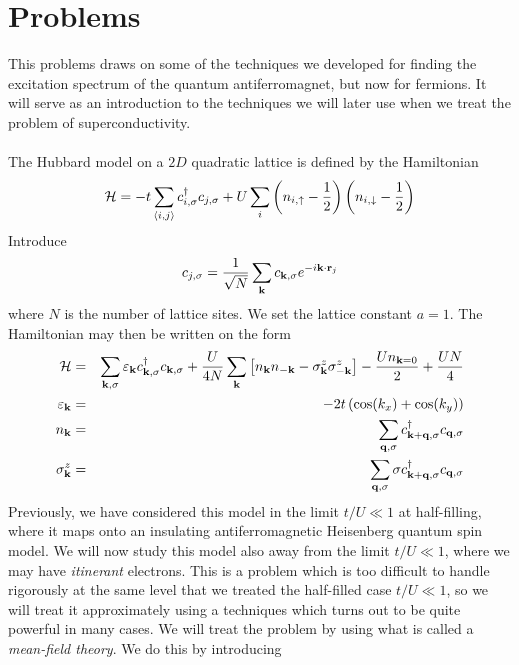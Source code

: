 \section*{Problems}

\begin{problem}
	
This problems draws on some of the techniques we developed for finding the excitation spectrum of the quantum antiferromagnet, but now for  fermions. It will serve as an introduction to the techniques we will later use when we treat the problem of superconductivity. 
\ \\
\ \\
The Hubbard model on a $2D$ quadratic lattice  is defined by the Hamiltonian
\begin{eqnarray}
	\mathcal{H} = -t \sum_{\langle i,j \rangle} c^{\dagger}_{i,\sigma} c_{j,\sigma} + 
	U \sum_i   \left( n_{i, \uparrow} -\frac{1}{2} \right) \left(   n_{i, \downarrow}  -\frac{1}{2} \right) \nonumber
\end{eqnarray}
Introduce 
\begin{eqnarray}
	c_{j,\sigma} = \frac{1}{\sqrt{N}} \sum_{{\bf k}} c_{{\bf k},\sigma} e^{- i {\bf k} \cdot {\bf r}_j} \nonumber
\end{eqnarray}
where $N$ is the number of lattice sites. We set the lattice constant $a=1$. The Hamiltonian may then be written on the form
\begin{eqnarray}
	\mathcal{H} &  = & \sum_{{\bf k},\sigma} \varepsilon_{{\bf k}} c^{\dagger}_{{\bf k},\sigma} c_{{\bf k},\sigma} + \frac{U}{4N} \sum_{{\bf k}} 
	\left[ n_{\bf k}  n_{-\bf k}  - \sigma^z_{\bf k}  \sigma^z_{-\bf k}  \right]  
	- \frac{U n_{{\bf k}=0}}{2} 
	+\frac{U N}{4}
	\nonumber \\
	\varepsilon_{{\bf k}} & = & - 2 t \left(  \cos(k_x) + \cos(k_y) \right) \nonumber  \\
	n_{\bf k} & = &  \sum_{{\bf q}, \sigma} c^{\dagger}_{{\bf k} + {\bf q},\sigma}  c_{{\bf q},\sigma} \nonumber \\
	\sigma^z_{\bf k} & = &  \sum_{{\bf q}, \sigma} \sigma c^{\dagger}_{{\bf k} + {\bf q},\sigma}  c_{{\bf q},\sigma} \nonumber 
\end{eqnarray} 
Previously, we have considered this model in the limit $t/U \ll 1$ at half-filling, where it maps onto an insulating antiferromagnetic Heisenberg quantum spin model. We will now study this model also away from the limit $t/U \ll 1$, where we may have {\it itinerant} electrons. This is a problem which is too difficult to handle rigorously at the same level that we treated the half-filled case $t/U \ll 1$, so we will treat it approximately using a techniques which turns out to be quite powerful in many cases.  We will treat the problem by using what is called a {\it mean-field theory}. We do this by introducing 

\end{problem}
